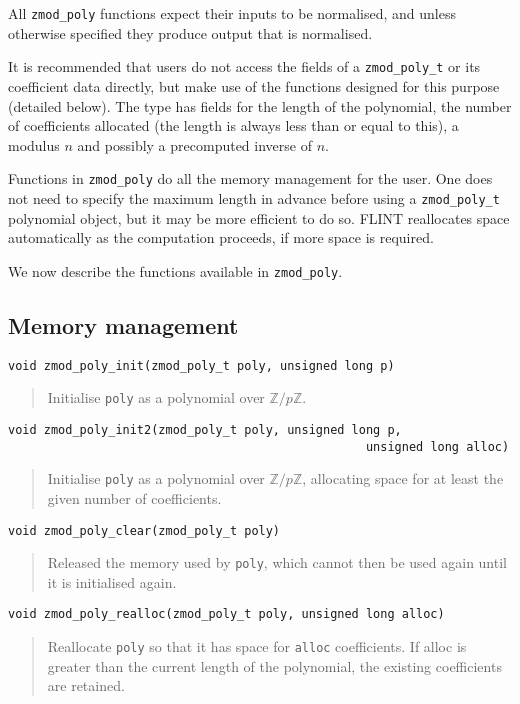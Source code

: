 \documentclass[a4paper,10pt]{article}
\newcommand{\Z}{\mathbb{Z}}
\newcommand{\code}{\lstinline}
\begin{document}
All \code{zmod_poly} functions expect their inputs to be normalised, and unless otherwise specified they produce output that is normalised. 

It is recommended that users do not access the fields of a \code{zmod_poly_t} or its coefficient data directly, but make use of the functions designed for this purpose (detailed below). The type has fields for the length of the polynomial, the number of coefficients allocated (the length is always less than or equal to this), a modulus $n$ and possibly a precomputed inverse of $n$.

Functions in \code{zmod_poly} do all the memory management for the user. One does not need to specify the maximum length in advance before using a \code{zmod_poly_t} polynomial object, but it may be more efficient to do so. FLINT reallocates space automatically as the computation proceeds, if more space is required. 

We now describe the functions available in \code{zmod_poly}.

\subsection{Memory management}

\begin{lstlisting}
void zmod_poly_init(zmod_poly_t poly, unsigned long p)
\end{lstlisting}
\begin{quote}
Initialise \code{poly} as a polynomial over $\Z/p\Z$. 
\end{quote}

\begin{lstlisting}
void zmod_poly_init2(zmod_poly_t poly, unsigned long p, 
                                                  unsigned long alloc)
\end{lstlisting}
\begin{quote}
Initialise \code{poly} as a polynomial over $\Z/p\Z$, allocating space for at least the given number of coefficients. 
\end{quote}

\begin{lstlisting}
void zmod_poly_clear(zmod_poly_t poly)
\end{lstlisting}
\begin{quote}
Released the memory used by \code{poly}, which cannot then be used again until it is initialised again.
\end{quote}

\begin{lstlisting}
void zmod_poly_realloc(zmod_poly_t poly, unsigned long alloc)
\end{lstlisting}
\begin{quote}
Reallocate \code{poly} so that it has space for \code{alloc} coefficients. If alloc is greater than the current length of the polynomial, the existing coefficients are retained.
\end{quote}
\end{document}
